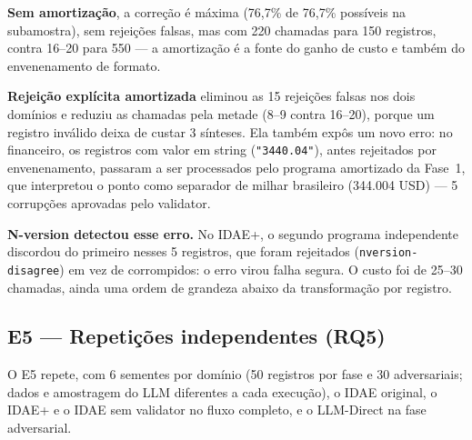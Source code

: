 \documentclass[sigconf,nonacm]{acmart}
\begin{document}
\textbf{Sem amortização}, a correção é máxima (76,7\% de 76,7\% possíveis na subamostra), sem rejeições falsas, mas com 220 chamadas para 150 registros, contra 16--20 para 550 --- a amortização é a fonte do ganho de custo e também do envenenamento de formato.

\textbf{Rejeição explícita amortizada} eliminou as 15 rejeições falsas nos dois domínios e reduziu as chamadas pela metade (8--9 contra 16--20), porque um registro inválido deixa de custar 3 sínteses. Ela também expôs um novo erro: no financeiro, os registros com valor em string (\texttt{"3440.04"}), antes rejeitados por envenenamento, passaram a ser processados pelo programa amortizado da Fase~1, que interpretou o ponto como separador de milhar brasileiro (344.004 USD) --- 5 corrupções aprovadas pelo validator.

\textbf{N-version detectou esse erro.} No IDAE+, o segundo programa independente discordou do primeiro nesses 5 registros, que foram rejeitados (\texttt{nversion-disagree}) em vez de corrompidos: o erro virou falha segura. O custo foi de 25--30 chamadas, ainda uma ordem de grandeza abaixo da transformação por registro.

\subsection{E5 --- Repetições independentes (RQ5)}

O E5 repete, com 6 sementes por domínio (50 registros por fase e 30 adversariais; dados e amostragem do LLM diferentes a cada execução), o IDAE original, o IDAE+ e o IDAE sem validator no fluxo completo, e o LLM-Direct na fase adversarial.

\begin{table}[h]
\caption{E5 --- 6 execuções por domínio (média $\pm$ desvio-padrão, \% de $n=280$)}
\label{tab:e5}
\end{table}
\end{document}
